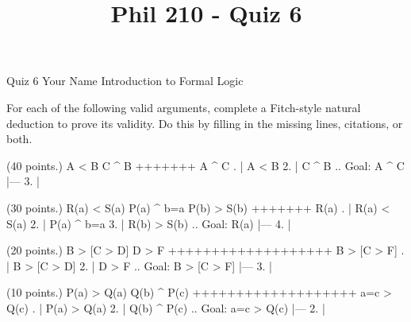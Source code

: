 
\title{Phil 210 - Quiz 6}

\heading
Quiz 6
Your Name
Introduction to Formal Logic
\endheading

For each of the following valid arguments, complete a Fitch-style natural deduction to prove its validity. Do this by filling in the missing lines, citations, or both.

\problems
{} (40 points.)
\argument
 A < B
 C ^ B
+++++++
 A ^ C
\endargument
        \answer
        . | A < B
         2. | C ^ B  ..  Goal: A ^ C
            |---
         3. | 
        \endfitchproof
        \endanswer

 (30 points.)
\argument
 R(a) < S(a)
 P(a) ^ b=a
 P(b) > S(b)
+++++++
 R(a)
\endargument
        \answer
        . | R(a) < S(a)
         2. | P(a) ^ b=a
         3. | R(b) > S(b)  ..  Goal: R(a)
            |---
         4. | 
        \endfitchproof
        \endanswer

 (20 points.)
\argument
 B > [C > D]
 D > F
+++++++++++++++++++
 B > [C > F]
\endargument
        \answer
        . | B > [C > D]
         2. | D > F        ..  Goal: B > [C > F]
            |---
         3. | 
        \endfitchproof
        \endanswer

 (10 points.)
\argument
 P(a) > Q(a)
 Q(b) ^ P(c)
+++++++++++++++++++
 a=c > Q(c)
\endargument
        \answer
        . | P(a) > Q(a)
         2. | Q(b) ^ P(c)  ..  Goal: a=c > Q(c)
            |---
         2. | 
        \endfitchproof
        \endanswer

\endproblems
\bye
